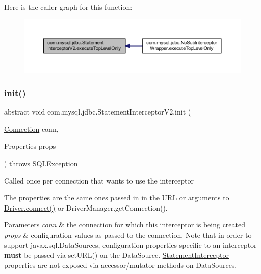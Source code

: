Here is the caller graph for this function\+:
\nopagebreak
\begin{figure}[H]
\begin{center}
\leavevmode
\includegraphics[width=350pt]{interfacecom_1_1mysql_1_1jdbc_1_1_statement_interceptor_v2_a36f03c5f5b1755d48549862d5b6c627f_icgraph}
\end{center}
\end{figure}
\mbox{\label{interfacecom_1_1mysql_1_1jdbc_1_1_statement_interceptor_v2_ae2d3d924826dcf4a4e025433af0b4d8f}} 
\subsubsection{\texorpdfstring{init()}{init()}}
{\footnotesize\ttfamily abstract void com.\+mysql.\+jdbc.\+Statement\+Interceptor\+V2.\+init (\begin{DoxyParamCaption}\item[{\mbox{\hyperlink{interfacecom_1_1mysql_1_1jdbc_1_1_connection}{Connection}}}]{conn,  }\item[{Properties}]{props }\end{DoxyParamCaption}) throws S\+Q\+L\+Exception\hspace{0.3cm}{\ttfamily [abstract]}}

Called once per connection that wants to use the interceptor

The properties are the same ones passed in in the U\+RL or arguments to \mbox{\hyperlink{classcom_1_1mysql_1_1jdbc_1_1_non_registering_driver_a834c012e752a01d1ee435b3461bb8218}{Driver.\+connect()}} or Driver\+Manager.\+get\+Connection().


\begin{DoxyParams}{Parameters}
{\em conn} & the connection for which this interceptor is being created \\
\hline
{\em props} & configuration values as passed to the connection. Note that in order to support javax.\+sql.\+Data\+Sources, configuration properties specific to an interceptor {\bfseries must} be passed via set\+U\+R\+L() on the Data\+Source. \mbox{\hyperlink{interfacecom_1_1mysql_1_1jdbc_1_1_statement_interceptor}{Statement\+Interceptor}} properties are not exposed via accessor/mutator methods on Data\+Sources.\\
\hline
\end{DoxyParams}

